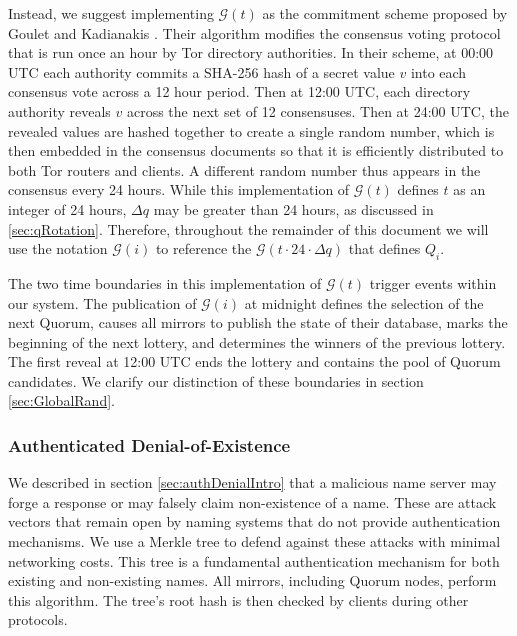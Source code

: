 \documentclass[USenglish,oneside,twocolumn]{article}
\begin{document}
Instead, we suggest implementing $ \mathcal{G}(t) $ as the commitment scheme proposed by Goulet and Kadianakis \cite{GouletCommitReveal}. Their algorithm modifies the consensus voting protocol that is run once an hour by Tor directory authorities. In their scheme, at 00:00 UTC each authority commits a SHA-256 hash of a secret value $ v $ into each consensus vote across a 12 hour period. Then at 12:00 UTC, each directory authority reveals $ v $ across the next set of 12 consensuses. Then at 24:00 UTC, the revealed values are hashed together to create a single random number, which is then embedded in the consensus documents so that it is efficiently distributed to both Tor routers and clients. A different random number thus appears in the consensus every 24 hours. While this implementation of $ \mathcal{G}(t) $ defines $ t $ as an integer of 24 hours, $ \Delta q $ may be greater than 24 hours, as discussed in \ref{sec:qRotation}. Therefore, throughout the remainder of this document we will use the notation $ \mathcal{G}(i) $ to reference the $ \mathcal{G}(t \cdot 24 \cdot \Delta q) $ that defines $ Q_{i} $.


The two time boundaries in this implementation of $ \mathcal{G}(t) $ trigger events within our system. The publication of $ \mathcal{G}(i) $ at midnight defines the selection of the next Quorum, causes all mirrors to publish the state of their database, marks the beginning of the next lottery, and determines the winners of the previous lottery. The first reveal at 12:00 UTC ends the lottery and contains the pool of Quorum candidates. We clarify our distinction of these boundaries in section \ref{sec:GlobalRand}. 


\subsubsection{Authenticated Denial-of-Existence}
\label{sec:authDenial}

We described in section \ref{sec:authDenialIntro} that a malicious name server may forge a response or may falsely claim non-existence of a name. These are attack vectors that remain open by naming systems that do not provide authentication mechanisms. We use a Merkle tree \cite{merkle1988digital} to defend against these attacks with minimal networking costs. This tree is a fundamental authentication mechanism for both existing and non-existing names. All mirrors, including Quorum nodes, perform this algorithm. The tree's root hash is then checked by clients during other protocols.
\end{document}
